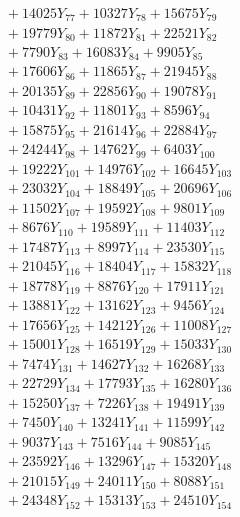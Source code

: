 \documentclass[a4paper,10pt]{article}
\begin{document}
{\begin{align}
&\;  + 14025 Y_{77} + 10327 Y_{78} + 15675 Y_{79} \\[0.3ex]
&\;  + 19779 Y_{80} + 11872 Y_{81} + 22521 Y_{82} \\[0.3ex]
&\;  + 7790 Y_{83} + 16083 Y_{84} + 9905 Y_{85} \\[0.3ex]
&\;  + 17606 Y_{86} + 11865 Y_{87} + 21945 Y_{88} \\[0.5ex]\allowbreak
&\;  + 20135 Y_{89} + 22856 Y_{90} + 19078 Y_{91} \\[0.3ex]
&\;  + 10431 Y_{92} + 11801 Y_{93} + 8596 Y_{94} \\[0.3ex]
&\;  + 15875 Y_{95} + 21614 Y_{96} + 22884 Y_{97} \\[0.3ex]
&\;  + 24244 Y_{98} + 14762 Y_{99} + 6403 Y_{100} \\[0.3ex]
&\;  + 19222 Y_{101} + 14976 Y_{102} + 16645 Y_{103} \\[0.3ex]
&\;  + 23032 Y_{104} + 18849 Y_{105} + 20696 Y_{106} \\[0.3ex]
&\;  + 11502 Y_{107} + 19592 Y_{108} + 9801 Y_{109} \\[0.3ex]
&\;  + 8676 Y_{110} + 19589 Y_{111} + 11403 Y_{112} \\[0.3ex]
&\;  + 17487 Y_{113} + 8997 Y_{114} + 23530 Y_{115} \\[0.3ex]
&\;  + 21045 Y_{116} + 18404 Y_{117} + 15832 Y_{118} \\[0.5ex]\allowbreak
&\;  + 18778 Y_{119} + 8876 Y_{120} + 17911 Y_{121} \\[0.3ex]
&\;  + 13881 Y_{122} + 13162 Y_{123} + 9456 Y_{124} \\[0.3ex]
&\;  + 17656 Y_{125} + 14212 Y_{126} + 11008 Y_{127} \\[0.3ex]
&\;  + 15001 Y_{128} + 16519 Y_{129} + 15033 Y_{130} \\[0.3ex]
&\;  + 7474 Y_{131} + 14627 Y_{132} + 16268 Y_{133} \\[0.3ex]
&\;  + 22729 Y_{134} + 17793 Y_{135} + 16280 Y_{136} \\[0.3ex]
&\;  + 15250 Y_{137} + 7226 Y_{138} + 19491 Y_{139} \\[0.3ex]
&\;  + 7450 Y_{140} + 13241 Y_{141} + 11599 Y_{142} \\[0.3ex]
&\;  + 9037 Y_{143} + 7516 Y_{144} + 9085 Y_{145} \\[0.3ex]
&\;  + 23592 Y_{146} + 13296 Y_{147} + 15320 Y_{148} \\[0.5ex]\allowbreak
&\;  + 21015 Y_{149} + 24011 Y_{150} + 8088 Y_{151} \\[0.3ex]
&\;  + 24348 Y_{152} + 15313 Y_{153} + 24510 Y_{154} \\[0.3ex]

\end{align}}
\end{document}
